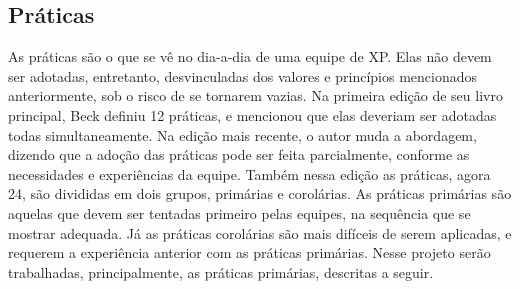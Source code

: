   \subsection{Práticas}
    As práticas são o que se vê no dia-a-dia de uma equipe de XP. Elas não devem ser adotadas, entretanto, desvinculadas dos valores e princípios mencionados anteriormente, sob o risco de se tornarem vazias. Na primeira edição de seu livro principal, Beck definiu 12 práticas, e mencionou que elas deveriam ser adotadas todas simultaneamente. Na edição mais recente, o autor muda a abordagem, dizendo que a adoção das práticas pode ser feita parcialmente, conforme as necessidades e experiências da equipe. Também nessa edição as práticas, agora 24, são divididas em dois grupos, primárias e corolárias. As práticas primárias são aquelas que devem ser tentadas primeiro pelas equipes, na sequência que se mostrar adequada. Já as práticas corolárias são mais difíceis de serem aplicadas, e requerem a experiência anterior com as práticas primárias. Nesse projeto serão trabalhadas, principalmente, as práticas primárias, descritas a seguir.

